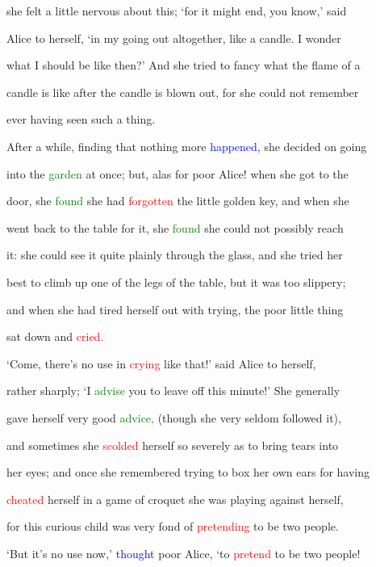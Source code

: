  she felt a little \textcolor{BurntOrange}{nervous} about this; ‘for it might end, you know,’ said

 Alice to herself, ‘in my going out altogether, like a candle. I wonder

 what I should be like then?’ And she tried to \textcolor{BurntOrange}{fancy} what the flame of a

 candle is like after the candle is blown out, for she could not remember

 ever having seen such a thing.



 After a while, finding that nothing more \textcolor{blue}{happened,} she decided on going

 into the \textcolor{green}{garden} at once; but, alas for poor Alice! when she got to the

 door, she \textcolor{green}{found} she had \textcolor{red}{forgotten} the little golden key, and when she

 went back to the table for it, she \textcolor{green}{found} she could not possibly reach

 it: she could see it quite plainly through the glass, and she tried her

 best to climb up one of the legs of the table, but it was too slippery;

 and when she had tired herself out with trying, the poor little thing

 sat down and \textcolor{red}{cried.}



 ‘Come, there’s no use in \textcolor{red}{crying} like that!’ said Alice to herself,

 rather sharply; ‘I \textcolor{green}{advise} you to \textcolor{BurntOrange}{leave} off this minute!’ She generally

 gave herself very \textcolor{BurntOrange}{good} \textcolor{green}{advice,} (though she very seldom followed it),

 and sometimes she \textcolor{red}{scolded} herself so severely as to bring tears into

 her eyes; and once she remembered trying to box her own ears for having

 \textcolor{red}{cheated} herself in a game of croquet she was playing against herself,

 for this curious \textcolor{BurntOrange}{child} was very fond of \textcolor{red}{pretending} to be two people.

 ‘But it’s no use now,’ \textcolor{blue}{thought} poor Alice, ‘to \textcolor{red}{pretend} to be two people!

